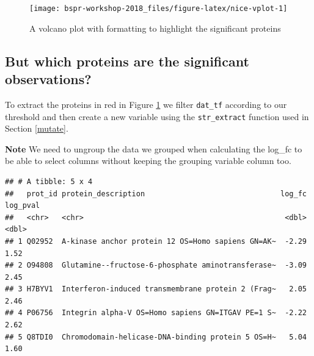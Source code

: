 \documentclass[12pt,]{book}
\newenvironment{Shaded}{\begin{snugshade}}{\end{snugshade}}
\newcommand{\CommentTok}[1]{\textcolor[rgb]{0.56,0.35,0.01}{\textit{#1}}}
\newcommand{\DataTypeTok}[1]{\textcolor[rgb]{0.13,0.29,0.53}{#1}}
\newcommand{\DecValTok}[1]{\textcolor[rgb]{0.00,0.00,0.81}{#1}}
\newcommand{\FloatTok}[1]{\textcolor[rgb]{0.00,0.00,0.81}{#1}}
\newcommand{\KeywordTok}[1]{\textcolor[rgb]{0.13,0.29,0.53}{\textbf{#1}}}
\newcommand{\NormalTok}[1]{#1}
\newcommand{\OperatorTok}[1]{\textcolor[rgb]{0.81,0.36,0.00}{\textbf{#1}}}
\newcommand{\StringTok}[1]{\textcolor[rgb]{0.31,0.60,0.02}{#1}}
\begin{document}
\begin{figure}

{\centering \texttt{[image: bspr-workshop-2018\_files/figure-latex/nice-vplot-1]} 

}

\caption{A volcano plot with formatting to highlight the significant proteins}\label{fig:nice-vplot}
\end{figure}

\hypertarget{but-which-proteins-are-the-significant-observations}{%
\subsection{But which proteins are the significant observations?}\label{but-which-proteins-are-the-significant-observations}}

To extract the proteins in red in Figure \ref{fig:nice-vplot} we filter \texttt{dat\_tf}
according to our threshold and then create a new variable using the \texttt{str\_extract}
function used in Section \ref{mutate}.

\textbf{Note} We need to ungroup the data we grouped when calculating the log\_fc to
be able to select columns without keeping the grouping variable column too.

\begin{Shaded}
\end{Shaded}

\begin{verbatim}
## # A tibble: 5 x 4
##   prot_id protein_description                               log_fc log_pval
##   <chr>   <chr>                                              <dbl>    <dbl>
## 1 Q02952  A-kinase anchor protein 12 OS=Homo sapiens GN=AK~  -2.29     1.52
## 2 O94808  Glutamine--fructose-6-phosphate aminotransferase~  -3.09     2.45
## 3 H7BYV1  Interferon-induced transmembrane protein 2 (Frag~   2.05     2.46
## 4 P06756  Integrin alpha-V OS=Homo sapiens GN=ITGAV PE=1 S~  -2.22     2.62
## 5 Q8TDI0  Chromodomain-helicase-DNA-binding protein 5 OS=H~   5.04     1.60
\end{verbatim}
\end{document}
